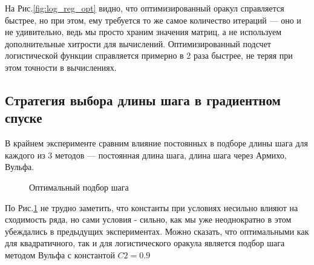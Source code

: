 \documentclass{article}
\begin{document}
	На Рис.\ref{fig:log_reg_opt} видно, что оптимизированный оракул справляется быстрее, но при этом, ему требуется то же самое количество итераций --- оно и не удивительно, ведь мы просто храним значения матриц, а не используем дополнительные хитрости для вычислений. Оптимизированный подсчет логистической функции справляется примерно в 2 раза быстрее, не теряя при этом точности в вычислениях.
	
	\vspace{2cm}
	\subsection{Стратегия выбора длины шага в градиентном спуске}
	
	В крайнем эксперименте сравним влияние постоянных в подборе длины шага для каждого из 3 методов --- постоянная длина шага, длина шага через Армихо, Вульфа.
	
	\newpage
	\begin{figure}[H]
		\centering
		\hfill %
		\caption{Оптимальный подбор шага}
		\label{fig:quadr_log_step}
	\end{figure}

	По Рис.\ref{fig:quadr_log_step} не трудно заметить, что константы при условиях несильно влияют на сходимость ряда, но сами условия - сильно, как мы уже неоднократно в этом убеждались в предыдущих экспериментах. Можно сказать, что оптимальными как для квадратичного, так и для логистического оракула является подбор шага методом Вульфа с константой $C2 = 0.9$
	
	
	
	
	
	
\end{document}

